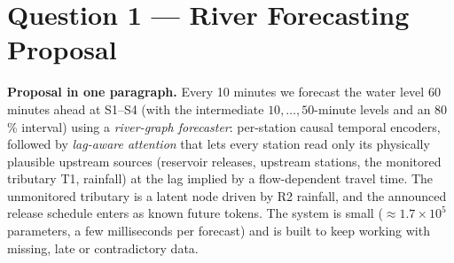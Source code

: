 \section*{Question 1 --- River Forecasting Proposal}

\noindent\textbf{Proposal in one paragraph.} Every 10 minutes we forecast the water level $60$ minutes ahead at S1--S4 (with the intermediate $10,\dots,50$-minute levels and an 80\,\% interval) using a \emph{river-graph forecaster}: per-station causal temporal encoders, followed by \emph{lag-aware attention} that lets every station read only its physically plausible upstream sources (reservoir releases, upstream stations, the monitored tributary T1, rainfall) at the lag implied by a flow-dependent travel time. The unmonitored tributary is a latent node driven by R2 rainfall, and the announced release schedule enters as known future tokens. The system is small ($\approx\!1.7\times10^{5}$ parameters, a few milliseconds per forecast) and is built to keep working with missing, late or contradictory data.


